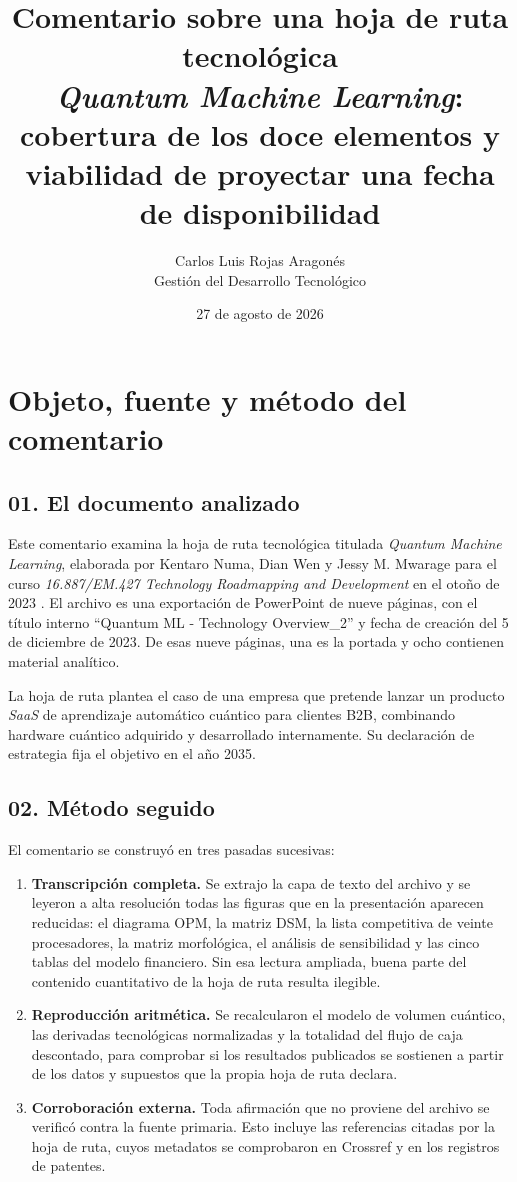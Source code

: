 \documentclass[11pt,letterpaper]{article}
\title{\textbf{Comentario sobre una hoja de ruta tecnológica}\\
\large \emph{Quantum Machine Learning}: cobertura de los doce elementos y
viabilidad de proyectar una fecha de disponibilidad}
\author{Carlos Luis Rojas Aragonés\\
Gestión del Desarrollo Tecnológico}
\date{27 de agosto de 2026}
\begin{document}
\maketitle

\section{Objeto, fuente y método del comentario}

\subsection*{01. El documento analizado}

Este comentario examina la hoja de ruta tecnológica titulada \emph{Quantum
Machine Learning}, elaborada por Kentaro Numa, Dian Wen y Jessy M. Mwarage para
el curso \emph{16.887/EM.427 Technology Roadmapping and Development} en el
otoño de 2023 \parencite{numa2023}. El archivo es una exportación de
PowerPoint de nueve páginas, con el título interno \enquote{Quantum ML -
Technology Overview\_2} y fecha de creación del 5 de diciembre de 2023. De esas
nueve páginas, una es la portada y ocho contienen material analítico.

La hoja de ruta plantea el caso de una empresa que pretende lanzar un producto
\emph{SaaS} de aprendizaje automático cuántico para clientes B2B, combinando
hardware cuántico adquirido y desarrollado internamente. Su declaración de
estrategia fija el objetivo en el año 2035.

\subsection*{02. Método seguido}

El comentario se construyó en tres pasadas sucesivas:

\begin{enumerate}
  \item \textbf{Transcripción completa.} Se extrajo la capa de texto del
    archivo y se leyeron a alta resolución todas las figuras que en la
    presentación aparecen reducidas: el diagrama OPM, la matriz DSM, la lista
    competitiva de veinte procesadores, la matriz morfológica, el análisis de
    sensibilidad y las cinco tablas del modelo financiero. Sin esa lectura
    ampliada, buena parte del contenido cuantitativo de la hoja de ruta
    resulta ilegible.
  \item \textbf{Reproducción aritmética.} Se recalcularon el modelo de volumen
    cuántico, las derivadas tecnológicas normalizadas y la totalidad del flujo
    de caja descontado, para comprobar si los resultados publicados se
    sostienen a partir de los datos y supuestos que la propia hoja de ruta
    declara.
  \item \textbf{Corroboración externa.} Toda afirmación que no proviene del
    archivo se verificó contra la fuente primaria. Esto incluye las
    referencias citadas por la hoja de ruta, cuyos metadatos se comprobaron en
    Crossref y en los registros de patentes.
\end{enumerate}
\end{document}
